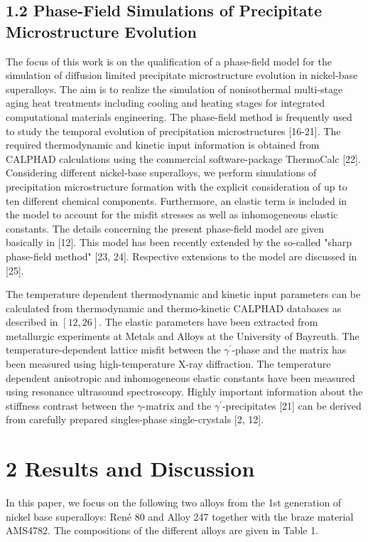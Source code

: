 \documentclass[10pt]{article}
\begin{document}
\subsection*{1.2 Phase-Field Simulations of Precipitate Microstructure Evolution}
The focus of this work is on the qualification of a phase-field model for the simulation of diffusion limited precipitate microstructure evolution in nickel-base superalloys. The aim is to realize the simulation of nonisothermal multi-stage aging heat treatments including cooling and heating stages for integrated computational materials engineering. The phase-field method is frequently used to study the temporal evolution of precipitation microstructures [16-21]. The required thermodynamic and kinetic input information is obtained from CALPHAD calculations using the commercial software-package ThermoCalc [22]. Considering different nickel-base superalloys, we perform simulations of\\
precipitation microstructure formation with the explicit consideration of up to ten different chemical components. Furthermore, an elastic term is included in the model to account for the misfit stresses as well as inhomogeneous elastic constants. The details concerning the present phase-field model are given basically in [12]. This model has been recently extended by the so-called "sharp phase-field method" [23, 24]. Respective extensions to the model are discussed in [25].

The temperature dependent thermodynamic and kinetic input parameters can be calculated from thermodynamic and thermo-kinetic CALPHAD databases as described in $[12,26]$. The elastic parameters have been extracted from metallurgic experiments at Metals and Alloys at the University of Bayreuth. The temperature-dependent lattice misfit between the $\gamma^{\prime}$-phase and the matrix has been measured using high-temperature $\mathrm{X}$-ray diffraction. The temperature dependent anisotropic and inhomogeneous elastic constants have been measured using resonance ultrasound spectroscopy. Highly important information about the stiffness contrast between the $\gamma$-matrix and the $\gamma^{\prime}$-precipitates [21] can be derived from carefully prepared singles-phase single-crystals [2, 12].

\section*{2 Results and Discussion}
In this paper, we focus on the following two alloys from the 1st generation of nickel base superalloys: René 80 and Alloy 247 together with the braze material AMS4782. The compositions of the different alloys are given in Table 1.
\end{document}
